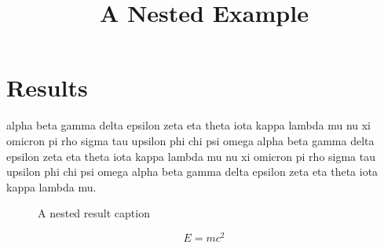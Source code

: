 \documentclass{article}
\title{A {Nested} Example}
\begin{document}

\section{Results}
alpha beta gamma delta epsilon zeta eta theta iota kappa lambda mu nu xi omicron pi rho sigma tau upsilon phi chi psi omega alpha beta gamma delta epsilon zeta eta theta iota kappa lambda mu nu xi omicron pi rho sigma tau upsilon phi chi psi omega alpha beta gamma delta epsilon zeta eta theta iota kappa lambda mu.
\begin{figure}
\centering
\caption[Short caption]{A {nested} result caption}
\end{figure}
\begin{equation}
E = mc^2
\end{equation}
\end{document}
